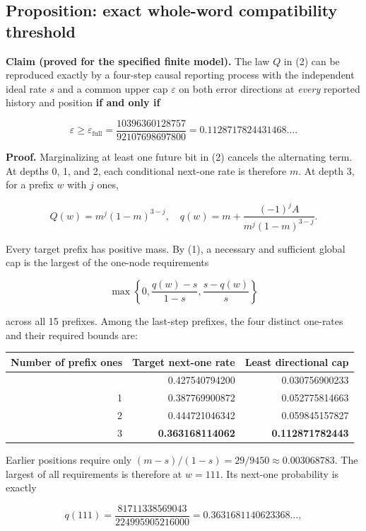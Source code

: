 \documentclass[
  10pt,
  a4paper,
]{article}
\begin{document}
\subsection{Proposition: exact whole-word compatibility threshold}\label{proposition-exact-whole-word-compatibility-threshold}

\textbf{Claim (proved for the specified finite model).} The law \(Q\) in (2) can be reproduced exactly by a four-step causal reporting process with the independent ideal rate \(s\) and a common upper cap \(\varepsilon\) on both error directions at \emph{every} reported history and position \textbf{if and only if}

\[
 \boxed{\displaystyle
 \varepsilon\geq\varepsilon_{\mathrm{full}}
 =\frac{10396360128757}{92107698697800}
 =0.1128717824431468\ldots.}\tag{3}
\]

\textbf{Proof.} Marginalizing at least one future bit in (2) cancels the alternating term. At depths 0, 1, and 2, each conditional next-one rate is therefore \(m\). At depth 3, for a prefix \(w\) with \(j\) ones,

\[
 Q(w)=m^j(1-m)^{3-j},\quad
 q(w)=m+\frac{(-1)^j A}{m^j(1-m)^{3-j}}.\tag{4}
\]

Every target prefix has positive mass. By (1), a necessary and sufficient global cap is the largest of the one-node requirements

\[
 \max\!\left\{0,\frac{q(w)-s}{1-s},\frac{s-q(w)}{s}\right\}
\]

across all 15 prefixes. Among the last-step prefixes, the four distinct one-rates and their required bounds are:

\begin{longtable}[]{@{}rrr@{}}
\toprule\noalign{}
Number of prefix ones & Target next-one rate & Least directional cap \\
\midrule\noalign{}
\endhead
\bottomrule\noalign{}
\endlastfoot
0 & 0.427540794200 & 0.030756900233 \\
1 & 0.387769900872 & 0.052775814663 \\
2 & 0.444721046342 & 0.059845157827 \\
3 & \textbf{0.363168114062} & \textbf{0.112871782443} \\
\end{longtable}

Earlier positions require only \((m-s)/(1-s)=29/9450\approx0.003068783\). The largest of all requirements is therefore at \(w=111\). Its next-one probability is exactly

\[
 q(111)=\frac{81711338569043}{224995905216000}
 =0.3631681140623368\ldots,
\]
\end{document}
